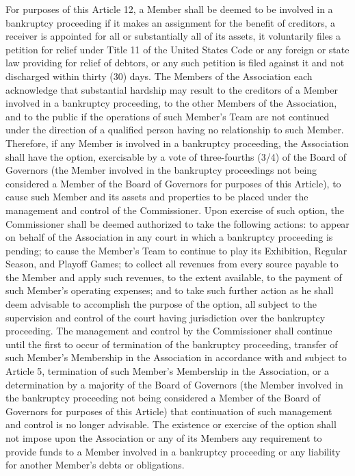 \documentclass[]{book}
\begin{document}
For purposes of this Article 12, a Member shall be deemed to be involved in a bankruptcy proceeding if it makes an assignment for the benefit of creditors, a receiver is appointed for all or substantially all of its assets, it voluntarily files a petition for relief under Title 11 of the United States Code or any foreign or state law providing for relief of debtors, or any such petition is filed against it and not discharged within thirty (30) days. The Members of the Association each acknowledge that substantial hardship may result to the creditors of a Member involved in a bankruptcy proceeding, to the other Members of the Association, and to the public if the operations of such Member's Team are not continued under the direction of a qualified person having no relationship to such Member. Therefore, if any Member is involved in a bankruptcy proceeding, the Association shall have the option, exercisable by a vote of three-fourths (3/4) of the Board of Governors (the Member involved in the bankruptcy proceedings not being considered a Member of the Board of Governors for purposes of this Article), to cause such Member and its assets and properties to be placed under the management and control of the Commissioner. Upon exercise of such option, the Commissioner shall be deemed authorized to take the following actions: to appear on behalf of the Association in any court in which a bankruptcy proceeding is pending; to cause the Member's Team to continue to play its Exhibition, Regular Season, and Playoff Games; to collect all revenues from every source payable to the Member and apply such revenues, to the extent available, to the payment of such Member's operating expenses; and to take such further action as he shall deem advisable to accomplish the purpose of the option, all subject to the supervision and control of the court having jurisdiction over the bankruptcy proceeding. The management and control by the Commissioner shall continue until the first to occur of termination of the bankruptcy proceeding, transfer of such Member's Membership in the Association in accordance with and subject to Article 5, termination of such Member's Membership in the Association, or a determination by a majority of the Board of Governors (the Member involved in the bankruptcy proceeding not being considered a Member of the Board of Governors for purposes of this Article) that continuation of such management and control is no longer advisable. The existence or exercise of the option shall not impose upon the Association or any of its Members any requirement to provide funds to a Member involved in a bankruptcy proceeding or any liability for another Member's debts or obligations.
\end{document}
